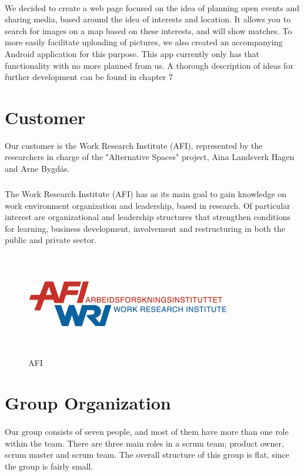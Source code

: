 \paragraph*{} We decided to create a web page focused on the idea of planning open events and sharing media, based around the idea of interests and location. It allows you to search for images on a map based on these interests, and will show matches. To more easily facilitate uploading of pictures, we also created an accompanying Android application for this purpose. This app currently only has that functionality with no more planned from us. A thorough description of ideas for further development can be found in chapter 7

\section{Customer}
Our customer is the Work Research Institute (AFI), represented by the researchers in charge of the "Alternative Spaces" project, Aina Landsverk Hagen and Arne Bygd\aa s.
\subparagraph{}The Work Research Institute (AFI) has as its main goal to gain knowledge on work environment organization and leadership, based in research. Of particular interest are organizational and leadership structures that strengthen conditions for learning, business development, involvement and restructuring in both the public and private sector.\\
\begin{figure}[ht!]
\centering
\includegraphics[width=90mm]{./Introduction/img/afi.png}
\caption{AFI \label{overflow}}
\end{figure}

\section{Group Organization}
\paragraph{} Our group consists of seven people, and most of them have more than one role within the team. There are three main roles in a scrum team; product owner, scrum master and scrum team. The overall structure of this group is flat, since the group is fairly small. 

